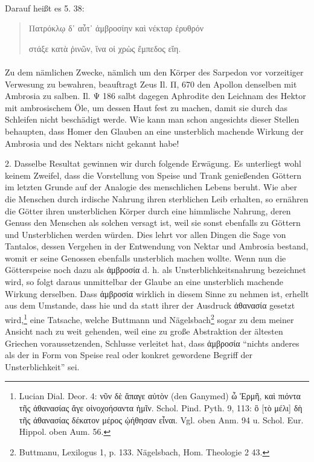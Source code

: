 \documentclass[a4paper, 11pt, oneside]{article}
\begin{document}
\paragraph{}
Darauf heißt es 5. 38:
\begin{quotation}\large
Πατρόκλῳ δ᾽ αὖτ᾽ ἀμβροσίην καὶ νέκταρ ἐρυθρόν

στάξε κατὰ ῥινῶν, ἵνα οἱ χρὼς ἔμπεδος εἴη.
\end{quotation}
\paragraph{}
Zu dem nämlichen Zwecke, nämlich um den Körper des Sarpedon vor vorzeitiger Verwesung zu bewahren, beauftragt Zeus Il. Π, 670 den Apollon denselben mit Ambrosia zu salben. Il. Ψ 186 salbt dagegen Aphrodite den Leichnam des Hektor mit ambrosischem Öle, um dessen Haut fest zu machen, damit sie durch das Schleifen nicht beschädigt werde. Wie kann man schon angesichts dieser Stellen behaupten, dass Homer den Glauben an eine unsterblich machende Wirkung der Ambrosia und des Nektars nicht gekannt habe!

2. Dasselbe Resultat gewinnen wir durch folgende Erwägung. Es unterliegt wohl keinem Zweifel, dass die Vorstellung von Speise und Trank genießenden Göttern im letzten Grunde auf der Analogie des menschlichen Lebens beruht. Wie aber die Menschen durch irdische Nahrung ihren sterblichen Leib erhalten, so ernähren die Götter ihren unsterblichen Körper durch eine himmlische Nahrung, deren Genuss den Menschen als solchen versagt ist, weil sie sonst ebenfalls zu Göttern und Unsterblichen werden würden. Dies lehrt vor allen Dingen die Sage von Tantalos, dessen Vergehen in der Entwendung von Nektar und Ambrosia bestand, womit er seine Genossen ebenfalls unsterblich machen wollte. Wenn nun die Götterspeise noch dazu als ἀμβροσία d. h. als Unsterblichkeitsnahrung bezeichnet wird, so folgt daraus unmittelbar der Glaube an eine unsterblich machende Wirkung derselben. Dass ἀμβροσία wirklich in diesem Sinne zu nehmen ist, erhellt aus dem Umstande, dass hie und da statt ihrer der Ausdruck ἀθανασία gesetzt wird,\footnote{Lucian Dial. Deor. 4: νῦν δὲ ἄπαγε αὐτὸν (den Ganymed) ὦ Ἑρμῆ, καὶ πιόντα τῆς ἀθανασίας ἄγε οἰνοχοήσαντα ἡμῖν. Schol. Pind. Pyth. 9, 113: ὃ [τὸ μέλι] δὴ τῆς ἀθανασίας δέκατον μέρος ᾠήθησαν εἶναι. Vgl. oben Anm. 94 u. Schol. Eur. Hippol. oben Aum. 56.} eine Tatsache, welche Buttmann und Nägelsbach\footnote{Buttmanu, Lexilogus 1, p. 133. Nägelsbach, Hom. Theologie 2 43.} sogar zu dem meiner Ansicht nach zu weit gehenden, weil eine zu große Abstraktion der ältesten Griechen voraussetzenden, Schlusse verleitet hat, dass ἀμβροσία "`nichts anderes als der in Form von Speise real oder konkret gewordene Begriff der Unsterblichkeit"' sei.
\end{document}
